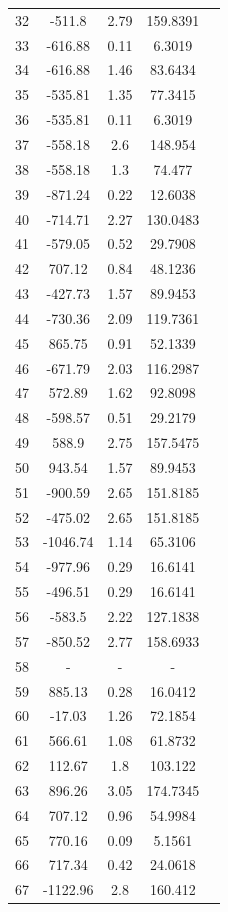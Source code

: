 {\begin{longtable}{ccccc}
32 & -511.8 & 2.79 & 159.8391 \\ 
33 & -616.88 & 0.11 & 6.3019 \\ 
34 & -616.88 & 1.46 & 83.6434 \\ 
35 & -535.81 & 1.35 & 77.3415 \\ 
36 & -535.81 & 0.11 & 6.3019 \\ 
37 & -558.18 & 2.6 & 148.954 \\ 
38 & -558.18 & 1.3 & 74.477 \\ 
39 & -871.24 & 0.22 & 12.6038 \\ 
40 & -714.71 & 2.27 & 130.0483 \\ 
41 & -579.05 & 0.52 & 29.7908 \\ 
42 & 707.12 & 0.84 & 48.1236 \\ 
43 & -427.73 & 1.57 & 89.9453 \\ 
44 & -730.36 & 2.09 & 119.7361 \\ 
45 & 865.75 & 0.91 & 52.1339 \\ 
46 & -671.79 & 2.03 & 116.2987 \\ 
47 & 572.89 & 1.62 & 92.8098 \\ 
48 & -598.57 & 0.51 & 29.2179 \\ 
49 & 588.9 & 2.75 & 157.5475 \\ 
50 & 943.54 & 1.57 & 89.9453 \\ 
51 & -900.59 & 2.65 & 151.8185 \\ 
52 & -475.02 & 2.65 & 151.8185 \\ 
53 & -1046.74 & 1.14 & 65.3106 \\ 
54 & -977.96 & 0.29 & 16.6141 \\ 
55 & -496.51 & 0.29 & 16.6141 \\ 
56 & -583.5 & 2.22 & 127.1838 \\ 
57 & -850.52 & 2.77 & 158.6933 \\ 
58 & - & - & - \\ 
59 & 885.13 & 0.28 & 16.0412 \\ 
60 & -17.03 & 1.26 & 72.1854 \\ 
61 & 566.61 & 1.08 & 61.8732 \\ 
62 & 112.67 & 1.8 & 103.122 \\ 
63 & 896.26 & 3.05 & 174.7345 \\ 
64 & 707.12 & 0.96 & 54.9984 \\ 
65 & 770.16 & 0.09 & 5.1561 \\ 
66 & 717.34 & 0.42 & 24.0618 \\ 
67 & -1122.96 & 2.8 & 160.412 \\ 

\end{longtable}}
